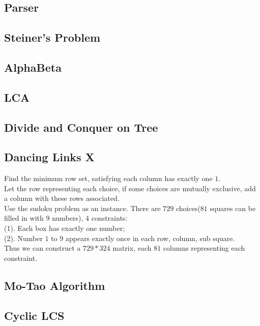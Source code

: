 \documentclass[10pt]{article}
\begin{document}
{\subsection{Parser}

\subsection{Steiner's Problem}

\subsection{AlphaBeta}

\subsection{LCA}

\subsection{Divide and Conquer on Tree}

\subsection{Dancing Links X}

Find the minimum row set, satisfying each column has exactly one $1$. \\
Let the row representing each choice, if some choices are mutually exclusive, add a column with these rows associated. \\
Use the sudoku problem as an instance. There are $729$ choices($81$ squares can be filled in with $9$ numbers), $4$ constraints:\\
(1). Each box has exactly one number; \\
(2). Number $1$ to $9$ appears exactly once in each row, column, sub square. \\
Thus we can construct a $729*324$ matrix, each $81$ columns representing each constraint.\\
\subsection{Mo-Tao Algorithm}

\subsection{Cyclic LCS}

}
\end{document}
